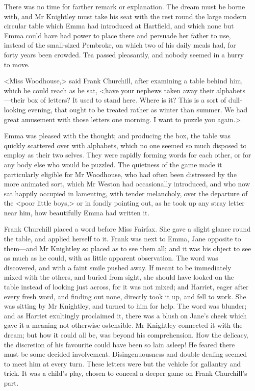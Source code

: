 There was no time for farther remark or explanation. The dream must be borne with, and Mr Knightley must take his seat with the rest round the large modern circular table which Emma had introduced at Hartfield, and which none but Emma could have had power to place there and persuade her father to use, instead of the small-sized Pembroke, on which two of his daily meals had, for forty years been crowded. Tea passed pleasantly, and nobody seemed in a hurry to move.

<Miss Woodhouse,> said Frank Churchill, after examining a table behind him, which he could reach as he sat, <have your nephews taken away their alphabets—their box of letters? It used to stand here. Where is it? This is a sort of dull-looking evening, that ought to be treated rather as winter than summer. We had great amusement with those letters one morning. I want to puzzle you again.>

Emma was pleased with the thought; and producing the box, the table was quickly scattered over with alphabets, which no one seemed so much disposed to employ as their two selves. They were rapidly forming words for each other, or for any body else who would be puzzled. The quietness of the game made it particularly eligible for Mr Woodhouse, who had often been distressed by the more animated sort, which Mr Weston had occasionally introduced, and who now sat happily occupied in lamenting, with tender melancholy, over the departure of the <poor little boys,> or in fondly pointing out, as he took up any stray letter near him, how beautifully Emma had written it.

Frank Churchill placed a word before Miss Fairfax. She gave a slight glance round the table, and applied herself to it. Frank was next to Emma, Jane opposite to them—and Mr Knightley so placed as to see them all; and it was his object to see as much as he could, with as little apparent observation. The word was discovered, and with a faint smile pushed away. If meant to be immediately mixed with the others, and buried from sight, she should have looked on the table instead of looking just across, for it was not mixed; and Harriet, eager after every fresh word, and finding out none, directly took it up, and fell to work. She was sitting by Mr Knightley, and turned to him for help. The word was blunder; and as Harriet exultingly proclaimed it, there was a blush on Jane's cheek which gave it a meaning not otherwise ostensible. Mr Knightley connected it with the dream; but how it could all be, was beyond his comprehension. How the delicacy, the discretion of his favourite could have been so lain asleep! He feared there must be some decided involvement. Disingenuousness and double dealing seemed to meet him at every turn. These letters were but the vehicle for gallantry and trick. It was a child's play, chosen to conceal a deeper game on Frank Churchill's part.

